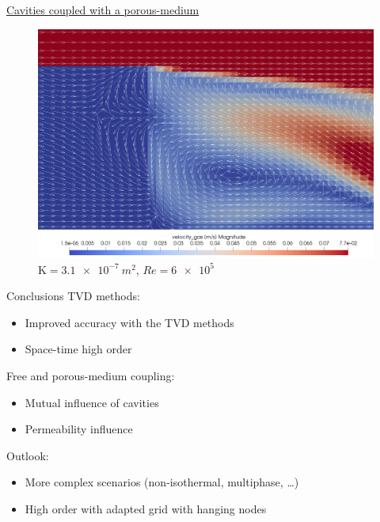 \documentclass{beamer}
\begin{document}
\begin{frame}{\hyperlink{coupledSupp}{Cavities coupled with a porous-medium}}
\begin{figure}
	\centering
	\includegraphics[height=0.82\textheight]{coupled_second_cavity.png}
	\caption{\tiny $\mathrm{K}=\SI{3.1e-7}{m^2}$, $Re=\num{6e5}$}
\end{figure}
\end{frame}
\begin{frame}{Conclusions}
TVD methods:
\begin{itemize}
	\item Improved accuracy with the TVD methods
	\item Space-time high order
\end{itemize}
Free and porous-medium coupling:
\begin{itemize}
	\item Mutual influence of cavities
	\item Permeability influence
\end{itemize}
Outlook:
\begin{itemize}
	\item More complex scenarios (non-isothermal, multiphase, \dots)
	\item High order with adapted grid with hanging nodes
\end{itemize}
\end{frame}
\end{document}
